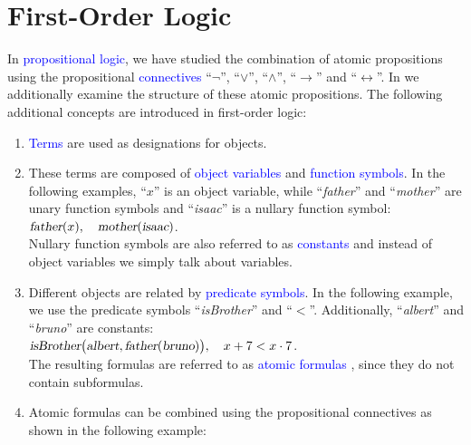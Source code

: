 \chapter{First-Order Logic}
In \textcolor{blue}{propositional logic}, we have studied the combination of atomic propositions using
the propositional \textcolor{blue}{connectives} ``$\neg$'', ``$\vee$'', ``$\wedge$'', ``$\rightarrow$'' and
``$\leftrightarrow$''.  In  we additionally 
examine the structure of these atomic propositions. The following additional concepts are introduced in
first-order logic: 
\begin{enumerate}
\item \textcolor{blue}{Terms} are used as designations for objects.
\item These terms are composed of \textcolor{blue}{object variables} and \textcolor{blue}{function symbols}.
      In the following examples, ``$x$'' is an object variable, while
      ``\textsl{father}'' and ``\textsl{mother}'' are unary function symbols and
      ``\textsl{isaac}'' is a nullary function symbol:
      \\[0.2cm]
      \hspace*{1.3cm}
      $\textsl{father}(x),\quad \textsl{mother}(\textsl{isaac})$.
      \\[0.2cm]
      Nullary function symbols are also referred to as \textcolor{blue}{constants}
      and instead of object variables we simply talk about variables.
\item Different objects are related by \textcolor{blue}{predicate symbols}.
      In the following example, we use the predicate symbols ``\textsl{isBrother}'' and ``$<$''.
      Additionally, ``\textsl{albert}'' and ``\textsl{bruno}'' are constants:
      \\[0.2cm]
      \hspace*{1.3cm}
      $\textsl{isBrother}\bigl(\textsl{albert}, \textsl{father}(\textsl{bruno})\bigr),\quad x+7 < x\cdot 7$.
      \\[0.2cm]
      The resulting formulas are referred to as \textcolor{blue}{atomic formulas} ,
      since they do not contain subformulas. 
\item Atomic formulas can be combined using the propositional connectives as shown in the following example:
      \\[0.2cm]
      \hspace*{1.3cm}

\end{enumerate}
